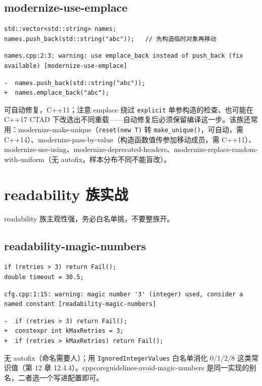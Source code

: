 \documentclass[12pt,a4paper,fontset=fandol]{ctexbook}
\newcommand{\cpp}[1]{C++#1}
\newcommand{\Fn}[1]{\texttt{#1()}}
\begin{document}
\subsection{modernize-use-emplace}\label{sec:ch13-s3e}
\begin{lstlisting}[style=cppstyle]
std::vector<std::string> names;
names.push_back(std::string("abc"));   // 先构造临时对象再移动
\end{lstlisting}
\begin{lstlisting}[style=shellstyle]
names.cpp:2:3: warning: use emplace_back instead of push_back (fix available) [modernize-use-emplace]
\end{lstlisting}
\begin{lstlisting}[style=diffstyle]
-  names.push_back(std::string("abc"));
+  names.emplace_back("abc");
\end{lstlisting}
可自动修复，\cpp{11}；注意 emplace 绕过 \texttt{explicit} 单参构造的检查、也可能在 \cpp{17} CTAD 下改选出不同重载——自动修复后必须保留编译这一步。该族还常用：modernize-make-unique（\texttt{reset(new T)} 转 \Fn{make\_unique}，可自动，需 \cpp{14}）、modernize-pass-by-value（构造函数值传参加移动成员，需 \cpp{11}）、modernize-use-using、modernize-deprecated-headers、modernize-replace-random-with-uniform（无 autofix，样本分布不同不能盲改）。

\section{readability 族实战}\label{sec:ch13-s4}
readability 族主观性强，务必白名单挑，不要整族开。
\subsection{readability-magic-numbers}\label{sec:ch13-s4a}
\begin{lstlisting}[style=cppstyle]
if (retries > 3) return Fail();
double timeout = 30.5;
\end{lstlisting}
\begin{lstlisting}[style=shellstyle]
cfg.cpp:1:15: warning: magic number '3' (integer) used, consider a named constant [readability-magic-numbers]
\end{lstlisting}
\begin{lstlisting}[style=diffstyle]
-  if (retries > 3) return Fail();
+  constexpr int kMaxRetries = 3;
+  if (retries > kMaxRetries) return Fail();
\end{lstlisting}
无 autofix（命名需要人）；用 \texttt{IgnoredIntegerValues} 白名单消化 0/1/2/8 这类常识值（第 12 章 12.4.4）。cppcoreguidelines-avoid-magic-numbers 是同一实现的别名，二者选一个写进配置即可。
\end{document}
